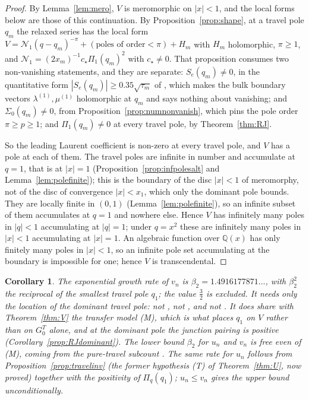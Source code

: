 \documentclass[11pt]{article}
\theoremstyle{plain}
\newtheorem{corollary}[theorem]{Corollary}
\theoremstyle{definition}
\theoremstyle{remark}
\newcommand{\Q}{\mathbb{Q}}
\theoremstyle{plain}\newtheorem*{maintheorem}{Main Theorem}
\begin{document}
\begin{proof}
By Lemma~\ref{lem:mero}, $V$ is meromorphic on $|x|<1$, and the local forms below are those of
this continuation. By Proposition~\ref{prop:shape}, at a travel pole $q_m$ the relaxed series has the local form
$V=\mathcal N_1(q-q_m)^{-\pi}+(\text{poles of order}<\pi)+H_m$ with $H_m$ holomorphic, $\pi\ge1$,
and $\mathcal N_1=(2x_m)^{-1}c_\star\Pi_1(q_m)^2$ with $c_\star\ne0$. That proposition consumes two
non-vanishing statements, and they are separate: $S_e(q_m)\ne0$, in the quantitative form
$|S_e(q_m)|\ge0.35\sqrt{\tau_m}$ of {\cite[Proposition \textup{prop:selower}]{Bonfioli2026bB}}, which makes the bulk boundary
vectors $\lambda^{(1)},\mu^{(1)}$ holomorphic at $q_m$ and says nothing about vanishing; and
$\Sigma_0(q_m)\ne0$, from Proposition~\ref{prop:numnonvanish}, which pins the pole order
$\pi\ge p\ge1$; and $\Pi_1(q_m)\ne0$ at every travel pole, by Theorem~\ref{thm:RJ}.

So the leading Laurent coefficient is non-zero at every travel pole, and $V$ has a pole at each of
them. The travel poles are infinite in number and accumulate at $q=1$, that is at $|x|=1$
(Proposition~\ref{prop:infpolesalt} and Lemma~\ref{lem:polefinite}); this is the boundary of the disc $|x|<1$ of meromorphy, not of the disc
of convergence $|x|<x_1$, which only the dominant pole bounds. They are locally finite in $(0,1)$
(Lemma~\ref{lem:polefinite}), so an infinite subset of them accumulates at $q=1$ and nowhere else.
Hence $V$ has infinitely many poles in $|q|<1$ accumulating at $|q|=1$; under $q=x^2$ these are
infinitely many poles in $|x|<1$ accumulating at $|x|=1$. An algebraic function over $\Q(x)$ has
only finitely many poles in $|x|<1$, so an infinite pole set accumulating at the boundary is
impossible for one; hence $V$ is transcendental.
\end{proof}

\begin{corollary}\label{cor:beta}
The exponential growth rate of $v_n$ is $\beta_2=1.4916177871\ldots$, with
$\beta_2^2$ the reciprocal of the smallest travel pole $q_1$; the value $\tfrac32$ is excluded.
It needs only the location of the dominant travel pole: not {\cite[Remark ``the sharp size of $T_2$; \textup{\textsc{heuristic}}'', \textup{lem:cos}]{Bonfioli2026bB}}, not
{\cite[Appendix \textup{app:annulus}]{Bonfioli2026bB}}, and not {\cite[Appendix \textup{app:star}]{Bonfioli2026bB}}. It does share with
Theorem~\ref{thm:V} the transfer model \textup{(M)}, which is what places $q_1$ on $V$ rather than
on $G^T_0$ alone, and at the dominant pole the junction pairing is positive
(Corollary~\ref{prop:RJdominant}). The
lower bound $\beta_2$ for $u_n$ and $v_n$ is free even of \textup{(M)}, coming from the
pure-travel subcount \cite{Bonfioli2026a}. The same rate for $u_n$
follows from Proposition~\ref{prop:travelinv} (the former hypothesis \textup{(T)} of
Theorem~\ref{thm:U}, now proved)
together with the positivity of $\Pi_q(q_1)$; $u_n\le v_n$ gives the upper bound
unconditionally.
\end{corollary}
\end{document}
